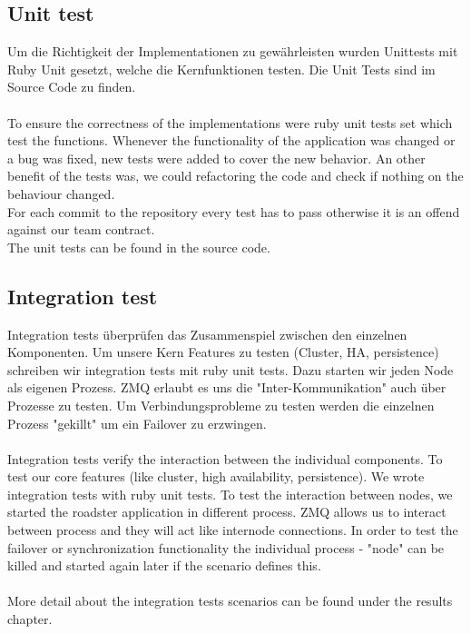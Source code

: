 \subsection{Unit test}
Um die Richtigkeit der Implementationen zu gewährleisten wurden Unittests mit
Ruby Unit gesetzt, welche die Kernfunktionen testen. Die Unit Tests sind im Source Code zu finden.\\
\\
To ensure the correctness of the implementations were ruby unit tests set 
which test the functions. Whenever the functionality of the application was changed or
a bug was fixed, new tests were added to cover the new behavior.
An other benefit of the tests was, we could refactoring the code and check 
if nothing on the behaviour changed.\\
For each commit to the repository every test has to pass otherwise it is
an offend against our team contract.\\
The unit tests can be found in the source code.

\subsection{Integration test}
Integration tests überprüfen das Zusammenspiel zwischen den einzelnen Komponenten.
Um unsere Kern Features zu testen (Cluster, HA, persistence) schreiben wir
integration tests mit ruby unit tests. Dazu starten wir jeden Node als eigenen Prozess.
ZMQ erlaubt es uns die "Inter-Kommunikation" auch über Prozesse zu testen.
Um Verbindungsprobleme zu testen werden die einzelnen Prozess "gekillt" um ein Failover zu erzwingen.\\
\\
Integration tests verify the interaction between the individual components. 
To test our core features (like cluster, high availability, persistence). We wrote integration
tests with ruby unit tests. To test the interaction between nodes, we started the roadster application
in different process. ZMQ allows us to interact between process and they will act like internode connections.
In order to test the failover or synchronization functionality the individual process - "node" 
can be killed and started again later if the scenario defines this.\\
\\
More detail about the integration tests scenarios can be found under the results chapter.

